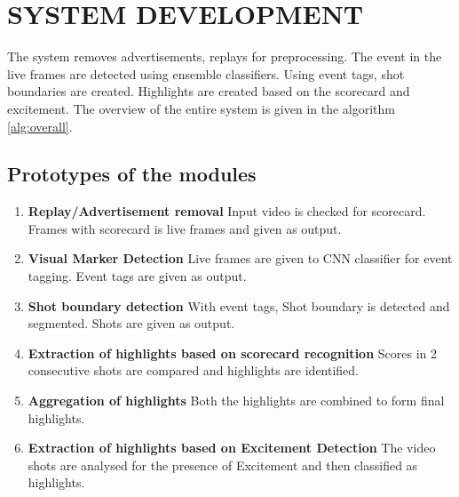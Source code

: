 
\chapter{SYSTEM DEVELOPMENT} %
 The system removes advertisements, replays for preprocessing. The event in the live frames are detected using ensemble classifiers. Using event tags, shot boundaries are created. Highlights are created based on the scorecard and excitement. 
 The overview of the entire system is given in the algorithm \ref{alg:overall}.
\section{Prototypes of the modules}
\begin{enumerate}
    \item \textbf{Replay/Advertisement removal} Input video is checked for scorecard. Frames with scorecard is live frames and given as output.
     \item \textbf{Visual Marker Detection} Live frames are given to CNN classifier for event tagging. Event tags are given as output.
      \item \textbf{Shot boundary detection} With event tags, Shot boundary is detected and segmented. Shots are given as output.
       \item \textbf{Extraction of highlights based on scorecard recognition} Scores in 2 consecutive shots are compared and highlights are identified.
        \item \textbf{Aggregation of highlights} Both the highlights are combined to form final highlights.
       \item \textbf{Extraction of highlights based on Excitement Detection} The video shots are analysed for the presence of Excitement and then classified as highlights.
\end{enumerate}
